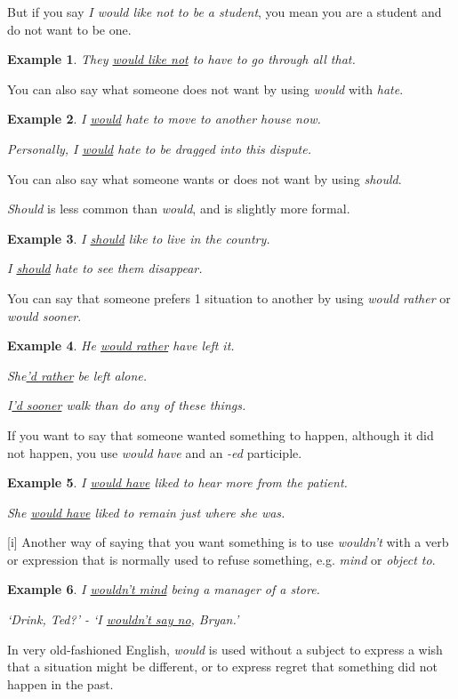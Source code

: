 \documentclass[oneside]{book}
\numberwithin{equation}{section}
\newtheorem{example}{Example}[section]
\begin{document}
But if you say \textit{I would like not to be a student}, you mean you are a student and do not want to be one.
\begin{example}
    They \underline{would like not} to have to go through all that.
\end{example}
You can also say what someone does not want by using \textit{would} with \textit{hate}.
\begin{example}
    I \underline{would} hate to move to another house now.
    
    Personally, I \underline{would} hate to be dragged into this dispute.
\end{example}
%
\noindent{} You can also say what someone wants or does not want by using \textit{should}.

\textit{Should} is less common than \textit{would}, and is slightly more formal.
\begin{example}
    I \underline{should} like to live in the country.
    
    I \underline{should} hate to see them disappear.
\end{example}
%
\noindent{} You can say that someone prefers 1 situation to another by using \textit{would rather} or \textit{would sooner}.
\begin{example}
    He \underline{would rather} have left it.
    
    She\underline{'d rather} be left alone.
    
    I\underline{'d sooner} walk than do any of these things.
\end{example}
%
\noindent{} If you want to say that someone wanted something to happen, although it did not happen, you use \textit{would have} and an \textit{-ed} participle.
\begin{example}
    I \underline{would have} liked to hear more from the patient.
    
    She \underline{would have} liked to remain just where she was.
\end{example}
%
\noindent{} [i] Another way of saying that you want something is to use \textit{wouldn't} with a verb or expression that is normally used to refuse something, e.g. \textit{mind} or \textit{object to}.
\begin{example}
    I \underline{wouldn't mind} being a manager of a store.
    
    `Drink, Ted?' - `I \underline{wouldn't say no}, Bryan.'
\end{example}
%
\noindent{} In very old-fashioned English, \textit{would} is used without a subject to express a wish that a situation might be different, or to express regret that something did not happen in the past.
\end{document}
